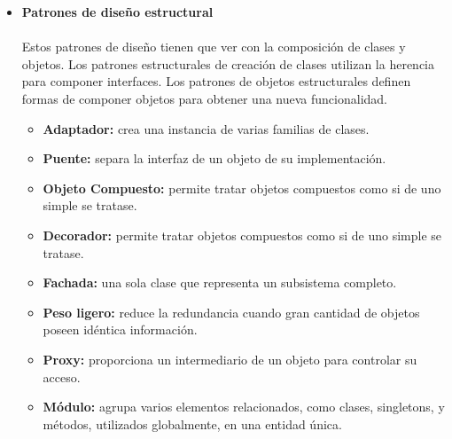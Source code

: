 \documentclass[twoside,twocolumn]{article}
\begin{document}
\begin{itemize}
	\item \textbf{Patrones de diseño estructural}
	\\
	\\Estos patrones de diseño tienen que ver con la composición de clases y objetos. Los patrones estructurales de creación de clases utilizan la herencia para componer interfaces. Los patrones de objetos estructurales definen formas de componer objetos para obtener una nueva funcionalidad.\cite{r}
	\begin{itemize}
		\item \textbf{Adaptador:}	crea una instancia de varias familias de clases.
		\item \textbf{Puente:} separa la interfaz de un objeto de su implementación.
		\item \textbf{Objeto Compuesto:} permite tratar objetos compuestos como si de uno simple se tratase.
		\item \textbf{Decorador:}	permite tratar objetos compuestos como si de uno simple se tratase.
		\item \textbf{Fachada:} una sola clase que representa un subsistema completo.
		\item \textbf{Peso ligero:} reduce la redundancia cuando gran cantidad de objetos poseen idéntica información.
		\item \textbf{Proxy:} proporciona un intermediario de un objeto para controlar su acceso.
		\item \textbf{Módulo:} agrupa varios elementos relacionados, como clases, singletons, y métodos, utilizados globalmente, en una entidad única.
	\end{itemize}
	

\end{itemize}
\end{document}
